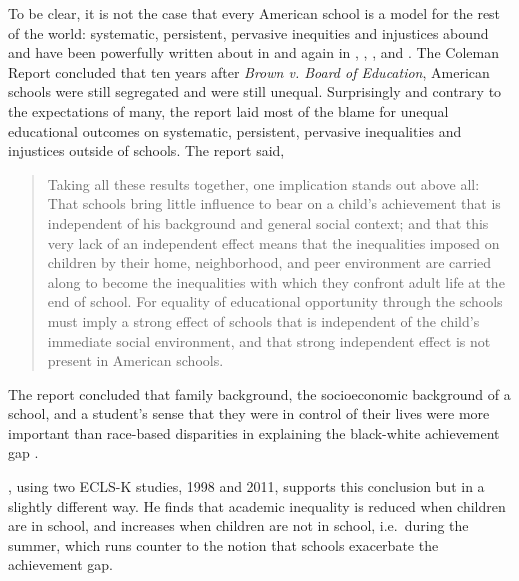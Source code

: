 To be clear, it is not the case that every American school is a model for the rest of the world: systematic, persistent, pervasive inequities and injustices abound and have been powerfully written about in \textcite{Kozol1992} and again in \textcite{Kozol2005}, \textcite{Valenzuela1999}, \textcite{Heitzeg2009}, and \textcite{Roithmayr2014}. The Coleman Report \parencite{Coleman1966} concluded that ten years after \textit{Brown v. Board of Education}, American schools were still segregated and were still unequal. Surprisingly and contrary to the expectations of many, the report laid most of the blame for unequal educational outcomes on systematic, persistent, pervasive inequalities and injustices outside of schools. The report said,
\begin{quote}\OnehalfSpacing%
  Taking all these results together, one implication stands out above all: That schools bring little influence to bear on a child's achievement that is independent of his background and general social context; and that this very lack of an independent effect means that the inequalities imposed on children by their home, neighborhood, and peer environment are carried along to become the inequalities with which they confront adult life at the end of school. For equality of educational opportunity through the schools must imply a strong effect of schools that is independent of the child's immediate social environment, and that strong independent effect is not present in American schools. 
\end{quote}
The report concluded that family background, the socioeconomic background of a school, and a student's sense that they were in control of their lives were more important than race-based disparities in explaining the black-white achievement gap \parencite{Pearce2016}.

 \textcite{Downey2020}, using two ECLS-K studies, 1998 and 2011, supports this conclusion but in a slightly different way. He finds that academic inequality is reduced when children are in school, and increases when children are not in school, i.e.~during the summer, which runs counter to the notion that schools exacerbate the achievement gap.


